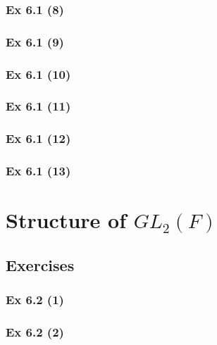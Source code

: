 \subsubsection{Ex 6.1 (8)}\label{sec:Ex_6.1.8}

\subsubsection{Ex 6.1 (9)}\label{sec:Ex_6.1.9}

\subsubsection{Ex 6.1 (10)}\label{sec:Ex_6.1.10}

\newpage		%

\subsubsection{Ex 6.1 (11)}\label{sec:Ex_6.1.11}

\subsubsection{Ex 6.1 (12)}\label{sec:Ex_6.1.12}

\subsubsection{Ex 6.1 (13)}\label{sec:Ex_6.1.13}

\newpage		%

\section{Structure of $GL_2(F)$}\label{sec:6.2}
\subsection{Exercises}\label{sec:6.2_Exercises}

\subsubsection{Ex 6.2 (1)}\label{sec:Ex_6.2.1}

\subsubsection{Ex 6.2 (2)}\label{sec:Ex_6.2.2}

